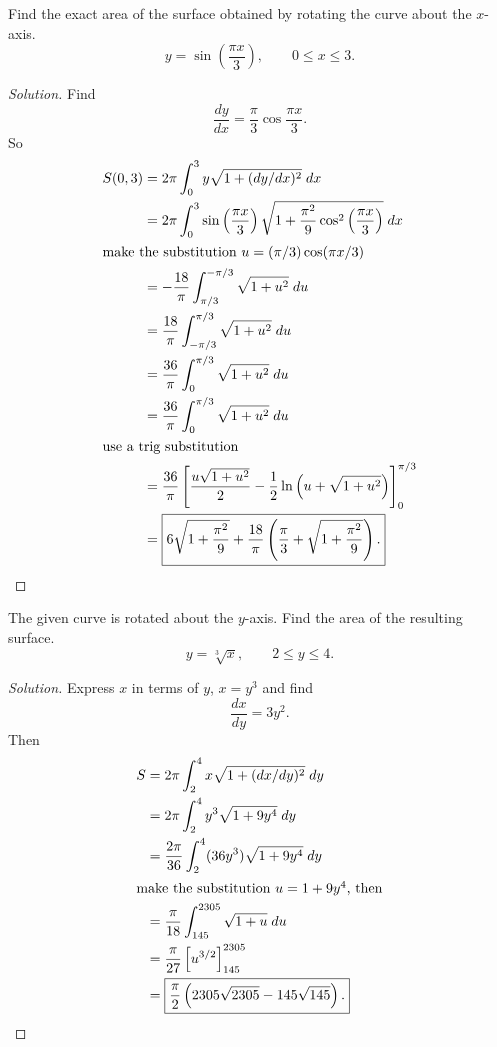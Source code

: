 \begin{problem}[WebAssign, HW 17, \# 6]
Find the exact area of the surface obtained by rotating the curve about the
$x$-axis.
\[
y=\sin\left(\frac{\pi x}{3}\right),\qquad 0\leq x\leq 3.
\]
\end{problem}
\begin{proof}[Solution]
Find
\[
\frac{dy}{dx}=\frac{\pi}{3}\cos\frac{\pi x}{3}.
\]
So
\begin{align*}
S(0,3)
&=2\pi\int_0^3y\sqrt{1+(dy/dx)^2}\;dx\\
&=2\pi\int_0^3\sin\left(\frac{\pi
  x}{3}\right)\sqrt{1+\frac{\pi^2}{9}\cos^2\left(\frac{\pi
  x}{3}\right)}\;dx\\
\intertext{make the substitution $u=(\pi/3)\cos(\pi x/3)$}
&=-\frac{18}{\pi}\int_{\pi/3}^{-\pi/3}\sqrt{1+u^2}\;du\\
&=\frac{18}{\pi}\int_{-\pi/3}^{\pi/3}\sqrt{1+u^2}\;du\\
&=\frac{36}{\pi}\int_0^{\pi/3}\sqrt{1+u^2}\;du\\
&=\frac{36}{\pi}\int_0^{\pi/3}\sqrt{1+u^2}\;du\\
\intertext{use a trig substitution}
&=\frac{36}{\pi}\left[\frac{u\sqrt{1+u^2}}{2}-\frac{1}{2}\ln\left(u+\sqrt{1+u^2}\right)\right]_0^{\pi/3}\\
&=\boxed{6\sqrt{1+\frac{\pi^2}{9}}+\frac{18}{\pi}\left(\frac{\pi}{3}+\sqrt{1+\frac{\pi^2}{9}}\right).}
\end{align*}
\end{proof}

\begin{problem}[WebAssign, HW 17, \# 7]
The given curve is rotated about the $y$-axis. Find the area of the
resulting surface.
\[
y=\sqrt[3]{x},\qquad 2\leq y\leq 4.
\]
\end{problem}
\begin{proof}[Solution]
Express $x$ in terms of $y$, $x=y^3$ and find
\[
\frac{dx}{dy}=3y^2.
\]
Then
\begin{align*}
S&=2\pi\int_2^4x\sqrt{1+(dx/dy)^2}\;dy\\
&=2\pi\int_2^4y^3\sqrt{1+9y^4}\;dy\\
&=\frac{2\pi}{36}\int_2^4(36y^3)\sqrt{1+9y^4}\;dy\\
\intertext{make the substitution $u=1+9y^4$, then}
&=\frac{\pi}{18}\int_{145}^{2305}\sqrt{1+u}\;du\\
&=\frac{\pi}{27}\left[u^{3/2}\right]_{145}^{2305}\\
&=\boxed{\frac{\pi}{2}\left(2305\sqrt{2305}-145\sqrt{145}\right).}
\end{align*}
\end{proof}


